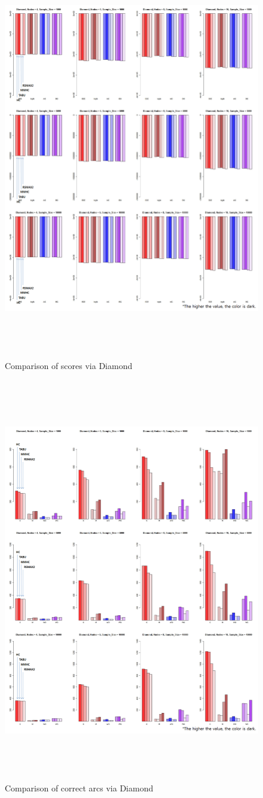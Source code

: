 	\begin{figure}[p]
	\centering
		\includegraphics[height=500pt]{images/05_Diamond_Score}
		\caption{Comparison of scores via Diamond}
	\end{figure}	

	\begin{figure}[p]
	\centering
		\includegraphics[height=500pt]{images/05_Diamond_Arcs}
		\caption{Comparison of correct arcs via Diamond}
	\end{figure}	
	
